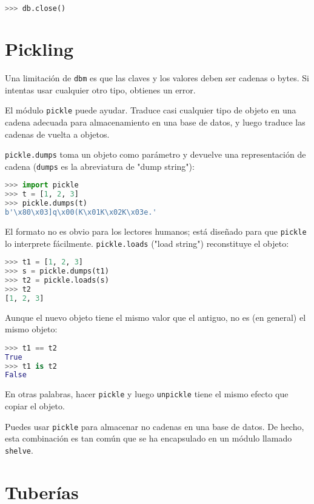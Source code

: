 \begin{lstlisting}[language=Python]
>>> db.close()
\end{lstlisting}

\section{Pickling}

Una limitación de \texttt{dbm} es que las claves y los valores deben ser cadenas o bytes. Si intentas usar cualquier otro tipo, obtienes un error.

El módulo \texttt{pickle} puede ayudar. Traduce casi cualquier tipo de objeto en una cadena adecuada para almacenamiento en una base de datos, y luego traduce las cadenas de vuelta a objetos.

\texttt{pickle.dumps} toma un objeto como parámetro y devuelve una representación de cadena (\texttt{dumps} es la abreviatura de "dump string"):

\begin{lstlisting}[language=Python]
>>> import pickle
>>> t = [1, 2, 3]
>>> pickle.dumps(t)
b'\x80\x03]q\x00(K\x01K\x02K\x03e.'
\end{lstlisting}

El formato no es obvio para los lectores humanos; está diseñado para que \texttt{pickle} lo interprete fácilmente. \texttt{pickle.loads} ("load string") reconstituye el objeto:

\begin{lstlisting}[language=Python]
>>> t1 = [1, 2, 3]
>>> s = pickle.dumps(t1)
>>> t2 = pickle.loads(s)
>>> t2
[1, 2, 3]
\end{lstlisting}

Aunque el nuevo objeto tiene el mismo valor que el antiguo, no es (en general) el mismo objeto:

\begin{lstlisting}[language=Python]
>>> t1 == t2
True
>>> t1 is t2
False
\end{lstlisting}

En otras palabras, hacer \texttt{pickle} y luego \texttt{unpickle} tiene el mismo efecto que copiar el objeto.

Puedes usar \texttt{pickle} para almacenar no cadenas en una base de datos. De hecho, esta combinación es tan común que se ha encapsulado en un módulo llamado \texttt{shelve}.

\section{Tuberías}

